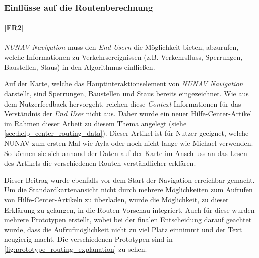 \subsubsection{Einflüsse auf die Routenberechnung}

\paragraph{[FR2]} \textit{NUNAV Navigation} muss den \textit{End Usern} die Möglichkeit bieten, abzurufen, welche Informationen zu Verkehrsereignissen (z.B. Verkehrsfluss, Sperrungen, Baustellen, Staus) in den Algorithmus einfließen.

\bigskip

Auf der Karte, welche das Hauptinteraktionselement von \textit{NUNAV Navigation} darstellt, sind Sperrungen, Baustellen und Staus bereits eingezeichnet. Wie aus dem Nutzerfeedback hervorgeht, reichen diese \textit{Context}-Informationen für das Verständnis der \textit{End User} nicht aus. Daher wurde ein neuer Hilfe-Center-Artikel im Rahmen dieser Arbeit zu diesem Thema angelegt (siehe \autoref{sec:help_center_routing_data}). Dieser Artikel ist für Nutzer geeignet, welche NUNAV zum ersten Mal wie Ayla oder noch nicht lange wie Michael verwenden. So können sie sich anhand der Daten auf der Karte im Anschluss an das Lesen des Artikels die verschiedenen Routen verständlicher erklären.

Dieser Beitrag wurde ebenfalls vor dem Start der Navigation erreichbar gemacht. Um die Standardkartenansicht nicht durch mehrere Möglichkeiten zum Aufrufen von Hilfe-Center-Artikeln zu überladen, wurde die Möglichkeit, zu dieser Erklärung zu gelangen, in die Routen-Vorschau integriert. Auch für diese wurden mehrere Prototypen erstellt, wobei bei der finalen Entscheidung darauf geachtet wurde, dass die Aufrufmöglichkeit nicht zu viel Platz einnimmt und der Text neugierig macht. Die verschiedenen Prototypen sind in \autoref{fig:prototype_routing_explanation} zu sehen.

